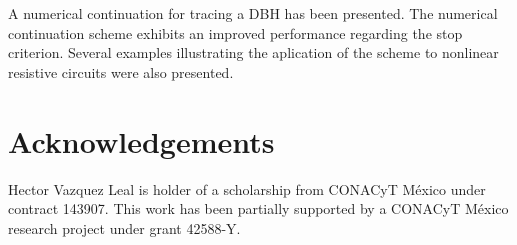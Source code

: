 \documentclass[conference]{IEEEtran}
\begin{document}
A numerical continuation for tracing a DBH has
been presented. The numerical continuation scheme exhibits an improved
performance regarding the stop criterion. Several examples illustrating
the aplication of the scheme to nonlinear
resistive circuits were also presented.



\section*{Acknowledgements}
Hector Vazquez Leal is holder of a scholarship from CONACyT M\'exico under contract 143907. This work has been partially supported by a CONACyT M\'exico research project under grant 42588-Y.




 


\IEEEpeerreviewmaketitle
\end{document}
